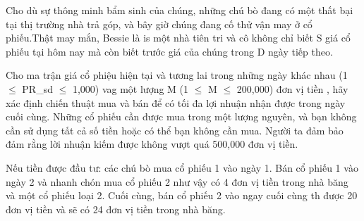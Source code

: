 Cho dù sự thông minh bẩm sinh của chúng, những chú bò đang có một thất  bại tại thị trường nhà trả góp, và bây giờ chúng đang cố thử vận may ở  cổ phiếu.Thật may mắn, Bessie là is một nhà tiên tri và cô không chỉ biết  S giá cổ phiếu tại hôm nay mà còn biết trước giá của chúng trong D ngày  tiếp theo.  

   Cho ma trận giá cổ phiệu hiện tại và tương lai trong những ngày khác nhau  (1  $\le$  PR\_sd  $\le$  1,000) vag một lượng M (1  $\le$  M  $\le$  200,000) đơn vị tiền , hãy xác định chiến thuật mua và bán để có tối đa lợi nhuận nhận được trong  ngày cuối cùng. Những cổ phiếu cần được mua trong một lượng nguyên, và bạn  không cần sử dụng tất cả số tiền hoặc có thể bạn không cần mua. Người ta  đảm bảo đảm rằng lời nhuận kiếm được không vượt quá 500,000 đơn vị tiền.  

   Nếu tiền được đầu tư: các chú bò mua cổ phiếu 1 vào ngày 1. Bán cổ phiếu  1 vào ngày 2 và nhanh chón mua cổ phiếu 2 như vậy có 4 đơn vị tiền trong  nhà băng và một cổ phiếu loại 2. Cuối cùng, bán cổ phiếu 2 vào ngay cuối  cùng th được 20 đơn vị tiền và sẽ có 24 đơn vị tiền trong nhà băng.  

\